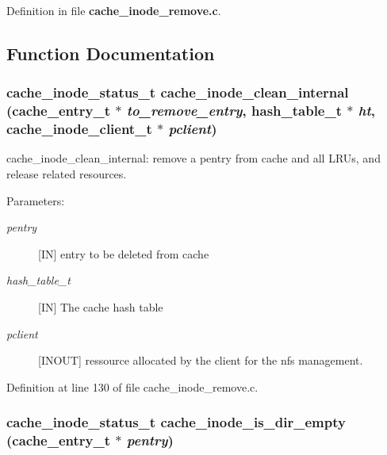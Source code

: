 Definition in file {\bf cache\_\-inode\_\-remove.c}.

\subsection{Function Documentation}
\subsubsection[{cache\_\-inode\_\-clean\_\-internal}]{\setlength{\rightskip}{0pt plus 5cm}cache\_\-inode\_\-status\_\-t cache\_\-inode\_\-clean\_\-internal (cache\_\-entry\_\-t $\ast$ {\em to\_\-remove\_\-entry}, \/  hash\_\-table\_\-t $\ast$ {\em ht}, \/  cache\_\-inode\_\-client\_\-t $\ast$ {\em pclient})}\label{cache__inode__remove_8c_b37607d51033bda097ac6ff80f79a0ff}


cache\_\-inode\_\-clean\_\-internal: remove a pentry from cache and all LRUs, and release related resources.

\begin{Desc}
\item[Parameters:]
\begin{description}
\item[{\em pentry}][IN] entry to be deleted from cache \item[{\em hash\_\-table\_\-t}][IN] The cache hash table \item[{\em pclient}][INOUT] ressource allocated by the client for the nfs management. \end{description}
\end{Desc}


Definition at line 130 of file cache\_\-inode\_\-remove.c.
\subsubsection[{cache\_\-inode\_\-is\_\-dir\_\-empty}]{\setlength{\rightskip}{0pt plus 5cm}cache\_\-inode\_\-status\_\-t cache\_\-inode\_\-is\_\-dir\_\-empty (cache\_\-entry\_\-t $\ast$ {\em pentry})}\label{cache__inode__remove_8c_9eb8017e3c52113989ef8b3cb68b9d0e}


